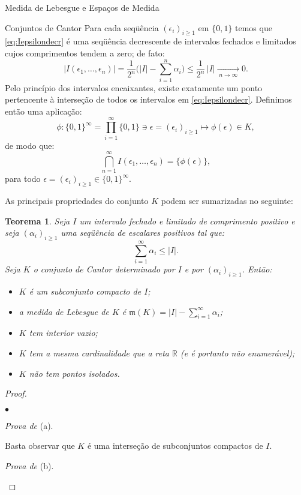\documentclass[oneside,final,11pt]{amsbook}
\newcommand{\R}{\mathds R}
\newcommand{\leb}{\mathfrak m}
\newcounter{contador}
\newenvironment{bulletindent}{\setcounter{contador}{0}
\begin{list} {$\bullet$}
{\usecounter{contador}
\setlength{\leftmargin}{10pt}
\setlength{\rightmargin}{10pt}
\setlength{\labelsep}{5pt}
\setlength{\itemsep}{10pt}
\setlength{\topsep}{10pt}}}
{\end{list}}
\theoremstyle{remark}\newtheorem{exercise}{Exercício}[chapter]
\theoremstyle{remark}\newtheorem{*exercise}[exercise]{\hbox to 0pt{\hskip 0pt minus 1fil*}Exercício}
\theoremstyle{definition}\newtheorem{exdefin}{Definição}[chapter]
\theoremstyle{plain}\newtheorem{teo}{Teorema}[section]
\theoremstyle{plain}\newtheorem{lem}[teo]{Lema}
\theoremstyle{plain}\newtheorem{prop}[teo]{Proposição}
\theoremstyle{plain}\newtheorem{cor}[teo]{Corolário}
\theoremstyle{definition}\newtheorem{defin}[teo]{Definição}
\theoremstyle{remark}\newtheorem{rem}[teo]{Observação}
\theoremstyle{definition}\newtheorem{notation}[teo]{Notação}
\theoremstyle{definition}\newtheorem{convention}[teo]{Convenção}
\theoremstyle{definition}\newtheorem{example}[teo]{Exemplo}
\numberwithin{section}{chapter}
\numberwithin{equation}{section}
\begin{document}
\begin{chapter}{Medida de Lebesgue e Espaços de Medida}
\begin{section}{Conjuntos de Cantor}
Para cada seqüência $(\epsilon_i)_{i\ge1}$ em $\{0,1\}$ temos que \eqref{eq:Iepsilondecr}
é uma seqüência decrescente de intervalos fechados e limitados cujos comprimentos tendem
a zero; de fato:
\begin{equation}\label{eq:lengthKnzero}
\big\vert I(\epsilon_1,\ldots,\epsilon_n)\big\vert=\frac1{2^n}\Big(\vert I\vert-\sum_{i=1}^n\alpha_i\Big)
\le\frac1{2^n}\,\vert I\vert\xrightarrow[\;n\to\infty\;]{}0.
\end{equation}
Pelo princípio dos intervalos encaixantes, existe exatamente um ponto pertencente à interseção
de todos os intervalos em \eqref{eq:Iepsilondecr}. Definimos então uma aplicação:
\[\phi:\{0,1\}^\infty=\prod_{i=1}^\infty\{0,1\}\ni\epsilon=(\epsilon_i)_{i\ge1}\longmapsto
\phi(\epsilon)\in K,\]
de modo que:
\begin{equation}\label{eq:defphiCantor}
\bigcap_{n=1}^\infty I(\epsilon_1,\ldots,\epsilon_n)=\big\{\phi(\epsilon)\big\},
\end{equation}
para todo $\epsilon=(\epsilon_i)_{i\ge1}\in\{0,1\}^\infty$.

As principais propriedades do conjunto $K$ podem ser sumarizadas no seguinte:
\begin{teo}
Seja $I$ um intervalo fechado e limitado de comprimento positivo e seja $(\alpha_i)_{i\ge1}$
uma seqüência de escalares positivos tal que:
\[\sum_{i=1}^\infty\alpha_i\le\vert I\vert.\]
Seja $K$ o conjunto de Cantor determinado por $I$ e por $(\alpha_i)_{i\ge1}$. Então:
\begin{itemize}
\item[(a)] $K$ é um subconjunto compacto de $I$;
\item[(b)] a medida de Lebesgue de $K$ é $\leb(K)=\vert I\vert-\sum_{i=1}^\infty\alpha_i$;
\item[(c)] $K$ tem interior vazio;
\item[(d)] $K$ tem a mesma cardinalidade que a reta $\R$ (e é portanto não enumerável);
\item[(e)] $K$ não tem pontos isolados.
\end{itemize}
\end{teo}
\begin{proof}\
\begin{bulletindent}
\item {\em Prova de\/} (a).

Basta observar que $K$ é uma interseção de subconjuntos compactos de $I$.

\item {\em Prova de\/} (b).


\end{bulletindent}
\end{proof}
\end{section}
\end{chapter}
\end{document}
